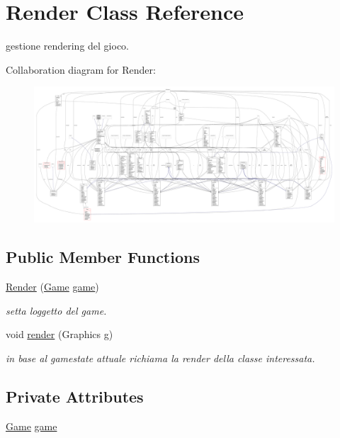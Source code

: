 \hypertarget{classprogetto_1_1_render}{}\section{Render Class Reference}
\label{classprogetto_1_1_render}


gestione rendering del gioco.  




Collaboration diagram for Render\+:
\nopagebreak
\begin{figure}[H]
\begin{center}
\leavevmode
\includegraphics[width=350pt]{classprogetto_1_1_render__coll__graph}
\end{center}
\end{figure}
\subsection*{Public Member Functions}
\begin{DoxyCompactItemize}
\item 
\hyperlink{classprogetto_1_1_render_a48af9c547fb0510ade78ea4456cb1bb4}{Render} (\hyperlink{classprogetto_1_1_game}{Game} \hyperlink{classprogetto_1_1_render_ac6a5ed6191fcf3a5bf0445921feb4f48}{game})
\begin{DoxyCompactList}\small\item\em setta l\textquotesingle{}oggetto del game. \end{DoxyCompactList}\item 
void \hyperlink{classprogetto_1_1_render_a203b6ad9d5e4d54dd1152986eec4dedc}{render} (Graphics g)
\begin{DoxyCompactList}\small\item\em in base al gamestate attuale richiama la render della classe interessata. \end{DoxyCompactList}\end{DoxyCompactItemize}
\subsection*{Private Attributes}
\begin{DoxyCompactItemize}
\item 
\hyperlink{classprogetto_1_1_game}{Game} \hyperlink{classprogetto_1_1_render_ac6a5ed6191fcf3a5bf0445921feb4f48}{game}
\end{DoxyCompactItemize}


